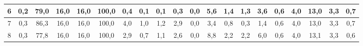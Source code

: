 \begin{sidewaystable}[]
\begin{tabular}{|c|c|c|c|c|c|c|c|c|c|c|c|c|c|c|c|c|c|c|c|}
    6  & 0,2                                              & 79,0                                            & 16,0                                            & 16,0                                            & 100,0                                           & 0,4                                             & 0,1                                             & 0,1                                             & 0,3                                             & 0,0                                             & 5,6                                              & 1,4                                              & 1,3                                              & 3,6                                              & 0,6                                              & 4,0                                              & 13,0                                             & 3,3                                              & 0,7                                              \\ \hline
    7  & 0,3                                              & 86,3                                            & 16,0                                            & 16,0                                            & 100,0                                           & 4,0                                             & 1,0                                             & 1,2                                             & 2,9                                             & 0,0                                             & 3,4                                              & 0,8                                              & 0,3                                              & 1,4                                              & 0,6                                              & 4,0                                              & 13,0                                             & 3,3                                              & 0,7                                              \\ \hline
    8  & 0,3                                              & 77,8                                            & 16,0                                            & 16,0                                            & 100,0                                           & 2,9                                             & 0,7                                             & 1,1                                             & 2,6                                             & 0,0                                             & 8,8                                              & 2,2                                              & 2,2                                              & 6,0                                              & 0,6                                              & 4,0                                              & 13,1                                             & 3,3                                              & 0,6                                              \\ \hline

\end{tabular}
\end{sidewaystable}
